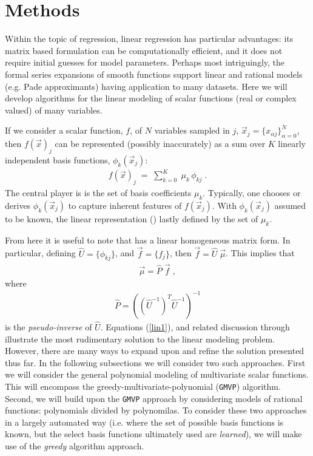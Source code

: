\documentclass[twocolumn,aps,prd,floatfix,preprintnumbers,a4paper,nofootinbib,
superscriptaddress,10pt]{revtex4-1}
\def\gmvp#1{greedy-multivariate-polynomial#1
  (\texttt{GMVP}#1)\gdef\gmvp{\texttt{GMVP}}}
\begin{document}
\section{Methods}
\label{meth}
%
Within the topic of regression, linear regression has particular advantages:
%
its matrix based formulation can be computationally efficient, and it does not require initial guesses for model parameters.
%
Perhaps most intriguingly, the formal series expansions of smooth functions support linear and rational models (e.g. Pade approximants) having application to many datasets.
%
Here we will develop algorithms for the linear modeling of scalar functions (real or complex valued) of many variables.
%
\par If we consider a scalar function, $f$, of $N$ variables sampled in $j$, $\vec{x}_j = \{x_{\alpha j}\}_{\alpha=0}^{N}$, then $f(\vec{x})_j$ can be represented (possibly inaccurately) as a sum over $K$ linearly independent basis functions, $\phi_k(\vec{x}_j)$:
%
\begin{align}
  \label{lin1}
  f({\vec{x}})_j \; = \; \sum_{k=0}^{K} \; \mu_{k} \, \phi_{kj}\; .
\end{align}
%
The central player is  is the set of basis coefficients $\mu_{k}$.
%
Typically, one chooses or derives $\phi_{k}(\vec{x}_j)$ to capture inherent features of $f(\vec{x}_j)$.
%
With $\phi_{k}(\vec{x}_j)$ assumed to be known, the linear representation () lastly defined by the set of $\mu_k$.
%
\def\vecmu{\vec{\mu}}
\def\vecf{\vec{f}}
\def\hatU{\hat{U}}
\def\hatP{\hat{P}}
%
\par From here it is useful to note that  has a linear homogeneous matrix form.
%
In particular, defining $\hat{U} = \{\phi_{kj}\}$, and $\vec{f} = \{f_j\}$, then $\vec{f} = \hat{U} \; \vec{\mu}$.
%
This implies that
%
\begin{align}
  \label{eq:linsol1}
  \vecmu = \hatP \; \vecf \; ,
\end{align}
%
where
%
\begin{align}
  \label{pinv1}
  \hatP = \left( \left( \hatU^{-1} \right)^T \hatU^{-1} \right)^{-1}
\end{align}
%
is the \textit{pseudo-inverse} of $\hatU$.
%
Equations (\ref{lin1}), and related discussion through  illustrate the most rudimentary solution to the linear modeling problem.
%
However, there are many ways to expand upon and refine the solution presented thus far.
%
In the following subsections we will consider two such approaches.
%
First we will consider the general polynomial modeling of multivariate scalar functions.
%
This will encompass the \gmvp{} algorithm.
%
Second, we will build upon the \gmvp{} approach by considering models of rational functions: polynomials divided by polynomilas.
%
To consider these two approaches in a largely automated way (i.e. where the set of possible basis functions is known, but the select basis functions ultimately used are \textit{learned}), we will make use of the \textit{greedy} algorithm approach.
%
\end{document}
